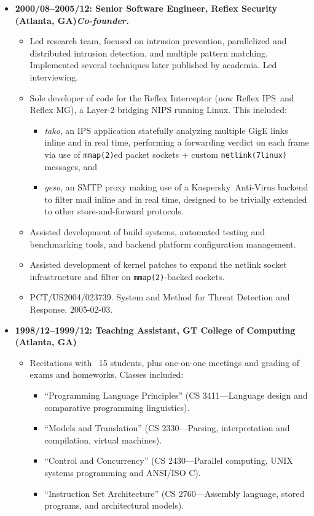 \documentclass{article}
\newenvironment{tightitemize}
{\begin{itemize}
  \setlength{\itemsep}{1pt}
  \setlength{\parskip}{0pt}
  \setlength{\parsep}{0pt}}
{\end{itemize}}
\begin{document}
\begin{tightitemize}
\pagebreak

\item \textbf{2000/08--2005/12: Senior Software Engineer, Reflex Security (Atlanta, GA)\hfill \tiny{\textit{Co-founder.}}}
\begin{tightitemize}
\item Led research team, focused on intrusion prevention, parallelized and
  distributed intrusion detection, and multiple pattern matching. Implemented
  several techniques later published by academia. Led interviewing.
\item Sole developer of code for the Reflex Interceptor (now Reflex IPS\texttrademark\ and
  Reflex MG\texttrademark), a Layer-2 bridging NIPS running Linux. This included:
\begin{tightitemize}
    \item \textit{tako}, an IPS application statefully analyzing multiple GigE links inline
      and in real time, performing a forwarding verdict on each frame via use
      of \texttt{mmap(2)}ed packet sockets + custom \texttt{netlink(7linux)} messages, and
    \item \textit{geso}, an SMTP proxy making use of a Kaspersky\texttrademark\ Anti-Virus backend to
      filter mail inline and in real time, designed to be trivially extended
      to other store-and-forward protocols.
\end{tightitemize}
\item Assisted development of build systems, automated testing and benchmarking tools, and backend
      platform configuration management.
\item Assisted development of kernel patches to expand the netlink socket
      infrastructure and filter on \texttt{mmap(2)}-backed sockets.
\item PCT/US2004/023739. System and Method for Threat Detection and Response. 2005-02-03.\hfill {}\\
\end{tightitemize}

\item \textbf{1998/12--1999/12: Teaching Assistant, GT College of Computing (Atlanta, GA)}
\begin{tightitemize}
\item Recitations with ~15 students, plus one-on-one meetings and grading of exams
and homeworks. Classes included:
\begin{tightitemize}
\item ``Programming Language Principles'' (CS 3411---Language design and comparative programming linguistics).
\item ``Models and Translation'' (CS 2330---Parsing, interpretation and compilation, virtual machines).
\item ``Control and Concurrency'' (CS 2430---Parallel computing, UNIX systems programming and ANSI/ISO C).
\item ``Instruction Set Architecture'' (CS 2760---Assembly language, stored programs, and architectural models).\\
\end{tightitemize}
\end{tightitemize}


\end{tightitemize}
\end{document}
